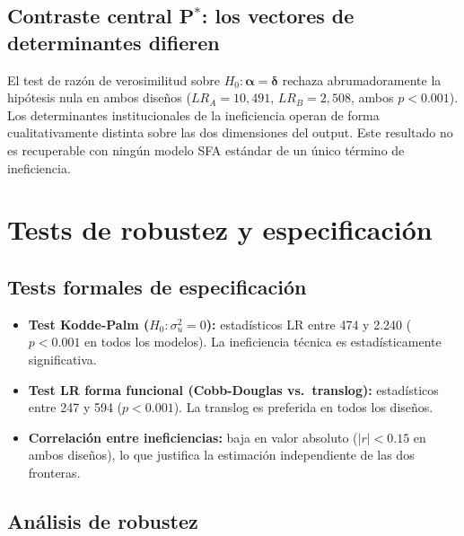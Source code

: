 \documentclass[12pt, a4paper]{article}
\newcommand{\bsym}[1]{\boldsymbol{#1}}
\begin{document}
\subsection{Contraste central P$^*$: los vectores de determinantes difieren}

El test de razón de verosimilitud sobre $H_0: \bsym{\alpha} = \bsym{\delta}$
rechaza abrumadoramente la hipótesis nula en ambos diseños ($LR_A=10{,}491$,
$LR_B=2{,}508$, ambos $p<0.001$). Los determinantes institucionales de la
ineficiencia operan de forma cualitativamente distinta sobre las dos dimensiones
del output. Este resultado no es recuperable con ningún modelo SFA estándar de
un único término de ineficiencia.

\section{Tests de robustez y especificación}

\subsection{Tests formales de especificación}

\begin{itemize}
  \item \textbf{Test Kodde-Palm ($H_0: \sigma^2_u=0$):} estadísticos LR entre
    474 y 2.240 ($p<0.001$ en todos los modelos). La ineficiencia técnica es
    estadísticamente significativa.
  \item \textbf{Test LR forma funcional (Cobb-Douglas vs.\ translog):}
    estadísticos entre 247 y 594 ($p<0.001$). La translog es preferida en todos
    los diseños.
  \item \textbf{Correlación entre ineficiencias:} baja en valor absoluto
    ($|r|<0.15$ en ambos diseños), lo que justifica la estimación independiente
    de las dos fronteras.
\end{itemize}

\subsection{Análisis de robustez}
\end{document}
